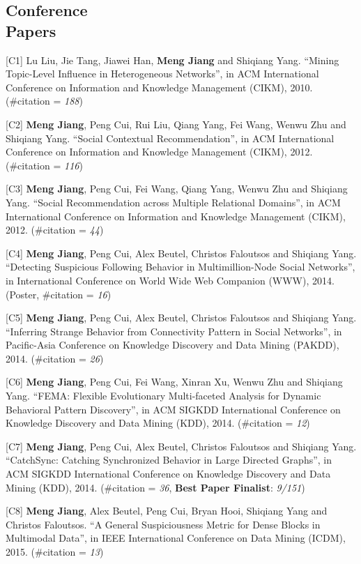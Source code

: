 \documentclass[margin, 10pt]{res}
\begin{document}
\begin{resume}
\section{Conference \\ Papers}

[C1] Lu Liu, Jie Tang, Jiawei Han, \textbf{Meng Jiang} and Shiqiang Yang. ``Mining Topic-Level Influence in Heterogeneous Networks'', in ACM International Conference on Information and Knowledge Management (CIKM), 2010. (\#citation = \textit{188})

[C2] \textbf{Meng Jiang}, Peng Cui, Rui Liu, Qiang Yang, Fei Wang, Wenwu Zhu and Shiqiang Yang. ``Social Contextual Recommendation'', in ACM International Conference on Information and Knowledge Management (CIKM), 2012. (\#citation = \textit{116})

[C3] \textbf{Meng Jiang}, Peng Cui, Fei Wang, Qiang Yang, Wenwu Zhu and Shiqiang Yang. ``Social Recommendation across Multiple Relational Domains'', in ACM International Conference on Information and Knowledge Management (CIKM), 2012. (\#citation = \textit{44})

[C4] \textbf{Meng Jiang}, Peng Cui, Alex Beutel, Christos Faloutsos and Shiqiang Yang. ``Detecting Suspicious Following Behavior in Multimillion-Node Social Networks'', in International Conference on World Wide Web Companion (WWW), 2014. (Poster, \#citation = \textit{16})

[C5] \textbf{Meng Jiang}, Peng Cui, Alex Beutel, Christos Faloutsos and Shiqiang Yang. ``Inferring Strange Behavior from Connectivity Pattern in Social Networks'', in Pacific-Asia Conference on Knowledge Discovery and Data Mining (PAKDD), 2014. (\#citation = \textit{26})

[C6] \textbf{Meng Jiang}, Peng Cui, Fei Wang, Xinran Xu, Wenwu Zhu and Shiqiang Yang. ``FEMA: Flexible Evolutionary Multi-faceted Analysis for Dynamic Behavioral Pattern Discovery'', in ACM SIGKDD International Conference on Knowledge Discovery and Data Mining (KDD), 2014. (\#citation = \textit{12})

[C7] \textbf{Meng Jiang}, Peng Cui, Alex Beutel, Christos Faloutsos and Shiqiang Yang. ``CatchSync: Catching Synchronized Behavior in Large Directed Graphs'', in ACM SIGKDD International Conference on Knowledge Discovery and Data Mining (KDD), 2014. (\#citation = \textit{36}, \textbf{Best Paper Finalist}: \textit{9/151})

[C8] \textbf{Meng Jiang}, Alex Beutel, Peng Cui, Bryan Hooi, Shiqiang Yang and Christos Faloutsos. ``A General Suspiciousness Metric for Dense Blocks in Multimodal Data'', in IEEE International Conference on Data Mining (ICDM), 2015. (\#citation = \textit{13})


\end{resume}
\end{document}
